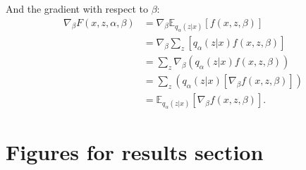 \noindent And the gradient with respect to $\beta$:
\begin{align*}
    \nabla_{\beta} F(x, z, \alpha, \beta) &= \nabla_{\beta} \mathbb{E}_{q_{\alpha}(z|x)}[f(x, z, \beta)] \\
    &= \nabla_{\beta} \sum_z [q_{\alpha}(z|x)f(x, z, \beta)] \\
    &= \sum_z \nabla_{\beta} (q_{\alpha}(z|x)f(x, z, \beta)) \\
    &= \sum_z (q_{\alpha}(z|x) [\nabla_{\beta} f(x, z, \beta)]) \\
    &= \mathbb{E}_{q_{\alpha}(z|x)} [\nabla_{\beta} f(x, z, \beta)].
\end{align*}


\chapter{Figures for results section}
\label{app:results}

